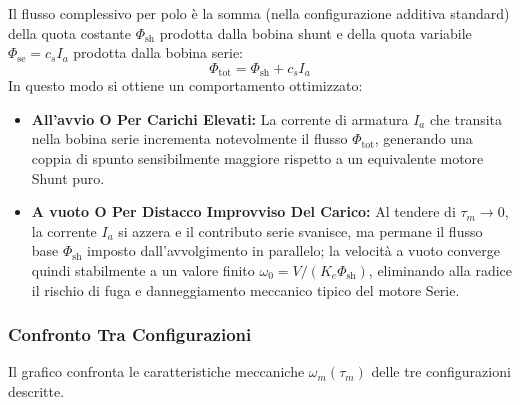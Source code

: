 ﻿\documentclass[11pt, a4paper]{article}
\begin{document}
Il flusso complessivo per polo è la somma (nella configurazione additiva standard) della quota costante $\Phi_{\text{sh}}$ prodotta dalla bobina shunt e della quota variabile $\Phi_{\text{se}} = c_s I_a$ prodotta dalla bobina serie:
\[
    \Phi_{\text{tot}} = \Phi_{\text{sh}} + c_s I_a
\]
In questo modo si ottiene un comportamento ottimizzato:
\begin{itemize}
    \item \textbf{All'avvio O Per Carichi Elevati:} La corrente di armatura $I_a$ che transita nella bobina serie incrementa notevolmente il flusso $\Phi_{\text{tot}}$, generando una coppia di spunto sensibilmente maggiore rispetto a un equivalente motore Shunt puro.
    \item \textbf{A vuoto O Per Distacco Improvviso Del Carico:} Al tendere di $\tau_m \to 0$, la corrente $I_a$ si azzera e il contributo serie svanisce, ma permane il flusso base $\Phi_{\text{sh}}$ imposto dall'avvolgimento in parallelo; la velocità a vuoto converge quindi stabilmente a un valore finito $\omega_0 = V / (K_e \Phi_{\text{sh}})$, eliminando alla radice il rischio di fuga e danneggiamento meccanico tipico del motore Serie.
\end{itemize}
\newpage

\subsubsection{Confronto Tra Configurazioni}
Il grafico confronta le caratteristiche meccaniche $\omega_m(\tau_m)$ delle tre configurazioni descritte.
\end{document}
